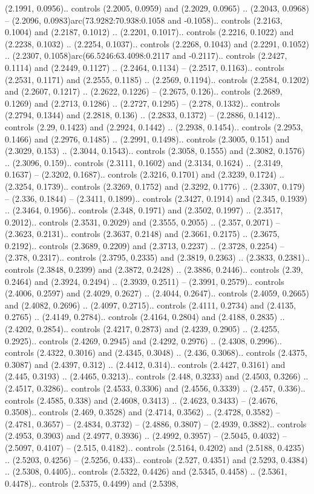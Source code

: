 (2.1991, 0.0956).. controls (2.2005, 0.0959) and (2.2029, 0.0965) .. (2.2043, 0.0968) -- (2.2096, 0.0983)arc(73.9282:70.938:0.1058 and -0.1058).. controls (2.2163, 0.1004) and (2.2187, 0.1012) .. (2.2201, 0.1017).. controls (2.2216, 0.1022) and (2.2238, 0.1032) .. (2.2254, 0.1037).. controls (2.2268, 0.1043) and (2.2291, 0.1052) .. (2.2307, 0.1058)arc(66.5246:63.4098:0.2117 and -0.2117).. controls (2.2427, 0.1114) and (2.2449, 0.1127) .. (2.2464, 0.1134) -- (2.2517, 0.1163).. controls (2.2531, 0.1171) and (2.2555, 0.1185) .. (2.2569, 0.1194).. controls (2.2584, 0.1202) and (2.2607, 0.1217) .. (2.2622, 0.1226) -- (2.2675, 0.126).. controls (2.2689, 0.1269) and (2.2713, 0.1286) .. (2.2727, 0.1295) -- (2.278, 0.1332).. controls (2.2794, 0.1344) and (2.2818, 0.136) .. (2.2833, 0.1372) -- (2.2886, 0.1412).. controls (2.29, 0.1423) and (2.2924, 0.1442) .. (2.2938, 0.1454).. controls (2.2953, 0.1466) and (2.2976, 0.1485) .. (2.2991, 0.1498).. controls (2.3005, 0.151) and (2.3029, 0.153) .. (2.3044, 0.1543).. controls (2.3058, 0.1555) and (2.3082, 0.1576) .. (2.3096, 0.159).. controls (2.3111, 0.1602) and (2.3134, 0.1624) .. (2.3149, 0.1637) -- (2.3202, 0.1687).. controls (2.3216, 0.1701) and (2.3239, 0.1724) .. (2.3254, 0.1739).. controls (2.3269, 0.1752) and (2.3292, 0.1776) .. (2.3307, 0.179) -- (2.336, 0.1844) -- (2.3411, 0.1899).. controls (2.3427, 0.1914) and (2.345, 0.1939) .. (2.3464, 0.1956).. controls (2.348, 0.1971) and (2.3502, 0.1997) .. (2.3517, 0.2012).. controls (2.3531, 0.2029) and (2.3555, 0.2055) .. (2.357, 0.2071) -- (2.3623, 0.2131).. controls (2.3637, 0.2148) and (2.3661, 0.2175) .. (2.3675, 0.2192).. controls (2.3689, 0.2209) and (2.3713, 0.2237) .. (2.3728, 0.2254) -- (2.378, 0.2317).. controls (2.3795, 0.2335) and (2.3819, 0.2363) .. (2.3833, 0.2381).. controls (2.3848, 0.2399) and (2.3872, 0.2428) .. (2.3886, 0.2446).. controls (2.39, 0.2464) and (2.3924, 0.2494) .. (2.3939, 0.2511) -- (2.3991, 0.2579).. controls (2.4006, 0.2597) and (2.4029, 0.2627) .. (2.4044, 0.2647).. controls (2.4059, 0.2665) and (2.4082, 0.2696) .. (2.4097, 0.2715).. controls (2.4111, 0.2734) and (2.4135, 0.2765) .. (2.4149, 0.2784).. controls (2.4164, 0.2804) and (2.4188, 0.2835) .. (2.4202, 0.2854).. controls (2.4217, 0.2873) and (2.4239, 0.2905) .. (2.4255, 0.2925).. controls (2.4269, 0.2945) and (2.4292, 0.2976) .. (2.4308, 0.2996).. controls (2.4322, 0.3016) and (2.4345, 0.3048) .. (2.436, 0.3068).. controls (2.4375, 0.3087) and (2.4397, 0.312) .. (2.4412, 0.314).. controls (2.4427, 0.3161) and (2.445, 0.3193) .. (2.4465, 0.3213).. controls (2.448, 0.3233) and (2.4503, 0.3266) .. (2.4517, 0.3286).. controls (2.4533, 0.3306) and (2.4556, 0.3339) .. (2.457, 0.336).. controls (2.4585, 0.338) and (2.4608, 0.3413) .. (2.4623, 0.3433) -- (2.4676, 0.3508).. controls (2.469, 0.3528) and (2.4714, 0.3562) .. (2.4728, 0.3582) -- (2.4781, 0.3657) -- (2.4834, 0.3732) -- (2.4886, 0.3807) -- (2.4939, 0.3882).. controls (2.4953, 0.3903) and (2.4977, 0.3936) .. (2.4992, 0.3957) -- (2.5045, 0.4032) -- (2.5097, 0.4107) -- (2.515, 0.4182).. controls (2.5164, 0.4202) and (2.5188, 0.4235) .. (2.5203, 0.4256) -- (2.5256, 0.433).. controls (2.527, 0.4351) and (2.5293, 0.4384) .. (2.5308, 0.4405).. controls (2.5322, 0.4426) and (2.5345, 0.4458) .. (2.5361, 0.4478).. controls (2.5375, 0.4499) and (2.5398, 